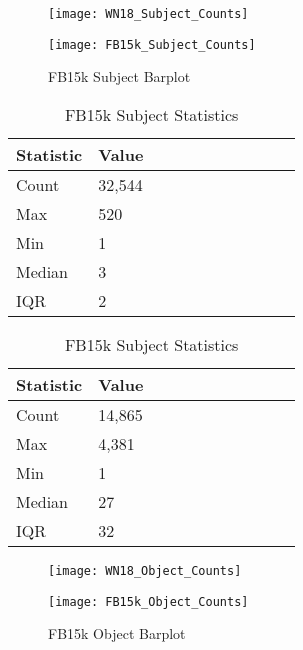 
\begin{figure}[H]
	\parbox{.5\linewidth}{
   		\caption{WN18 Subject Barplot}
   		\centering
    		\texttt{[image: WN18\_Subject\_Counts]}
		}
	\hfill
	\parbox{.5\linewidth}{
		\caption{FB15k Subject Barplot}
   		\centering
		\texttt{[image: FB15k\_Subject\_Counts]}
		}
\end{figure}


\begin{table}[H]
	\parbox{.5\linewidth}{
		\caption{WN18 Subject Statistics}
		\centering
		\begin{tabular}{lllllllllll}
  			\textbf{Statistic} & \textbf{Value}  \\
  			\hline
			Count & 32,544 \\
			Max & 520 \\
			Min & 1 \\
  			Median & 3 \\
  			IQR & 2 \\
		\end{tabular}
		}
	\hfill
	\parbox{.5\linewidth}{
		\caption{FB15k Subject Statistics}
		\centering
		\begin{tabular}{lllllllllll}
  			\textbf{Statistic} & \textbf{Value}  \\
  			\hline
			Count &14,865 \\
			Max & 4,381 \\
			Min & 1 \\
  			Median & 27 \\
  			IQR & 32 \\
		\end{tabular}
		}
\end{table}


\begin{figure}[H]
	\parbox{.5\linewidth}{
   		\caption{WN18 Object Barplot}
   		\centering
    		\texttt{[image: WN18\_Object\_Counts]}
		}
	\hfill
	\parbox{.5\linewidth}{
		\caption{FB15k Object Barplot}
   		\centering
		\texttt{[image: FB15k\_Object\_Counts]}
		}
\end{figure}


